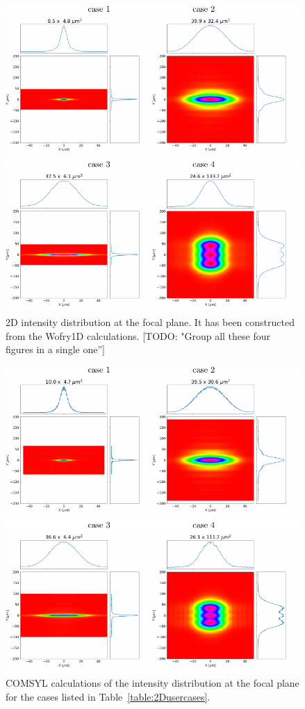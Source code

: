 \documentclass{iucr}              %
\newcommand{\todo}[1]{{\color{red}[TODO: "#1'']}}
\begin{document}
\begin{figure}\label{fig:2DWofry1D}
    \includegraphics[width=0.99\textwidth]{figures/fig_wofry.pdf}
    \caption{2D intensity distribution at the focal plane. It has been constructed from the Wofry1D calculations.
    \todo{Group all these four figures in a single one}
    }
\end{figure}

\begin{figure}\label{fig:comsyl}
    \includegraphics[width=0.99\textwidth]{figures/fig_comsyl.pdf}
    \caption{COMSYL calculations of the intensity distribution at the focal plane for the cases listed in Table~\ref{table:2Dusercases}.
    }
\end{figure}
\end{document}
